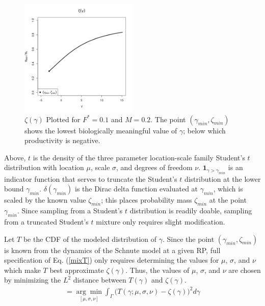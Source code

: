 %

%
\begin{figure}
\vspace*{-1cm}
\includegraphics[width=0.5\textwidth]{../gpBias/zeta.png}
\vspace*{-1.3cm}
\caption{$\zeta(\gamma)$ Plotted for $F^*=0.1$ and $M=0.2$. The point 
$(\gamma_{min}, \zeta_{min})$ shows the lowest biologically meaningful 
value of $\gamma$; below which productivity is negative.}
\end{figure}
 
%
Above, $t$ is the density of the three parameter location-scale family Student's $t$ 
distribution with location $\mu$, scale $\sigma$, and degrees of freedom $\nu$. 
$\bm{1}_{\gamma>\gamma_{min}}$ is an indicator function that serves to truncate the 
Student's $t$ distribution at the lower bound $\gamma_{min}$. 
$\delta(\gamma_{min})$ is the Dirac delta function evaluated at $\gamma_{min}$, 
which is scaled by the known value $\zeta_{min}$; this places probability mass 
$\zeta_{min}$ at the point $\gamma_{min}$. Since sampling from a Student's $t$ 
distribution is readily doable, sampling from a truncated Student's $t$ mixture 
only requires slight modification. 

Let $T$ be the CDF of the modeled distribution of $\gamma$. Since the point 
$(\gamma_{min}, \zeta_{min})$ is known from the dynamics of the Schnute model 
at a given RP, full specification of Eq. (\ref{mixT}) only requires determining 
the values for $\mu$, $\sigma$, and $\nu$ which make $T$ best approximate 
$\zeta(\gamma)$. Thus, the values of $\mu$, $\sigma$, and $\nu$ are chosen by 
minimizing the $L^2$ distance between $T(\gamma)$ and $\zeta(\gamma)$.
\begin{align}
[\hat\mu, \hat\sigma, \hat\nu]=\underset{{[\mu, \sigma, \nu]}}{\arg\min}\int_\Gamma \big(T(\gamma; \mu, \sigma, \nu) - \zeta(\gamma)\big)^2 d\gamma
\end{align}  

